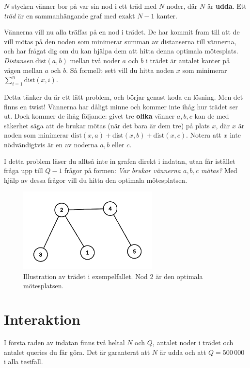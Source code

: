 $N$ stycken vänner bor på var sin nod i ett träd med $N$ noder, där $N$ är \textbf{udda}.
Ett \emph{träd} är en sammanhängande graf med exakt $N-1$ kanter.

Vännerna vill nu alla träffas på en nod i trädet.
De har kommit fram till att de vill mötas på den noden som minimerar
summan av distanserna till vännerna, och har frågat dig om du kan hjälpa dem att
hitta denna optimala mötesplats.
\emph{Distansen} $\text{dist}(a,b)$ mellan två noder $a$ och $b$ i trädet är antalet
kanter på vägen mellan $a$ och $b$.
Så formellt sett vill du hitta noden $x$ som minimerar
$\sum_{i=1}^{n} \text{dist}(x,i)$.

Detta tänker du är ett lätt problem, och börjar genast koda en lösning.
Men det finns en twist!
Vännerna har dåligt minne och kommer inte ihåg hur trädet ser ut.
Dock kommer de ihåg följande: givet tre \textbf{olika} vänner
$a,b,c$ kan de med säkerhet säga att de brukar mötas (när det bara är dem tre) på plats
$x$, där $x$ är noden som minimerar
$\text{dist}(x,a) +\text{dist}(x,b) +\text{dist}(x,c)$.
Notera att $x$ inte nödvändigtvis är en av noderna $a,b$ eller $c$.

I detta problem läser du alltså inte in grafen direkt i indatan,
utan får istället fråga upp till $Q-1$ frågor på formen:
\emph{Var brukar vännerna $a,b,c$ mötas?}
Med hjälp av dessa frågor vill du hitta
den optimala mötesplatsen.

\begin{figure}[!h]
\begin{center}
  \includegraphics[width=7cm]{sample.png}
\end{center}
  \caption{Illustration av trädet i exempelfallet. Nod 2 är den optimala mötesplatsen.}
\end{figure}

\section*{Interaktion}

I första raden av indatan finns två heltal $N$ och $Q$,
antalet noder i trädet och antalet queries du får göra.
Det är garanterat att $N$ är udda och att $Q = 500\,000$ i alla testfall.

